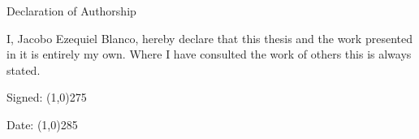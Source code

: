\renewcommand{\MakeTextField}[2]{{\vbox to #2{\vfill\hbox to #1{\hrulefill}}}}
\thispagestyle{empty}
\begin{center}
\vspace{3cm}
{\LARGE Declaration of Authorship}
\vspace*{1cm}
\end{center}
I, Jacobo Ezequiel Blanco, hereby declare that this thesis and the work presented in it is entirely my own. Where I have consulted the work of others this is always stated.
\vspace{1cm}

\noindent
Signed: \line(1,0){275}

\vspace{1cm}

\noindent
Date: \line(1,0){285}

